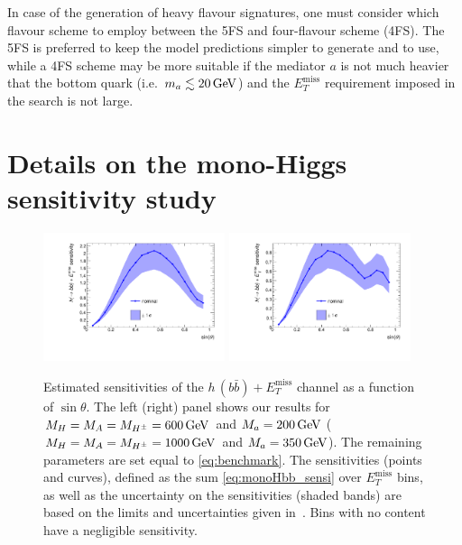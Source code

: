 \documentclass[a4paper, 11pt,notoc]{article}
\newcommand{\MET}{\ensuremath{E_T^\mathrm{miss}}\xspace}
\newcommand{\met}{\MET}
\newcommand{\mA}{\ensuremath{M_{A}}\xspace}
\newcommand{\ma}{\ensuremath{M_{a}}\xspace}
\newcommand{\mH}{\ensuremath{M_{H}}\xspace}
\newcommand{\mHc}{\ensuremath{M_{H^{\pm}}}\xspace}
\begin{document}
In case of the generation of heavy flavour signatures, one must consider which flavour scheme to employ between the 5FS and four-flavour scheme (4FS). The 5FS is preferred to keep the model predictions simpler to generate and to use, while a 4FS scheme may be more suitable if the mediator $a$ is not much heavier that the bottom quark (i.e.~$m_a \lesssim 20 \, {\rm GeV}$) and the $\MET$ requirement imposed in the search is not large. 


\section{Details on the mono-Higgs sensitivity study}
\label{app:extramonoh}

\begin{figure}[t!]
\centering
\includegraphics[width=0.475\textwidth]{monoHbb_sinp_scan_1_sensi_1D.pdf} \quad 
\includegraphics[width=0.475\textwidth]{monoHbb_sinp_scan_2_sensi_1D.pdf}
\vspace{4mm}
\caption{Estimated sensitivities of  the $h \, (b \bar b)+\MET$ channel as a function of $\sin \theta$. The left (right) panel shows our results for $\mH = \mA = \mHc = 600 \, {\rm GeV}$ and $\ma = 200 \, {\rm GeV}$ ($\mH = \mA = \mHc = 1000 \, {\rm GeV}$ and $\ma = 350 \, {\rm GeV}$).  The remaining parameters are set equal to \eqref{eq:benchmark}. The sensitivities (points and curves), defined as the sum \eqref{eq:monoHbb_sensi} over \met bins, as well as the uncertainty on the sensitivities (shaded {\color{green} bands})  are based on the limits and uncertainties given in~\cite{Aaboud:2017yqz}. Bins with no content have a negligible sensitivity. }
\label{fig:monoHbb_appendix1}
\end{figure}
\end{document}
